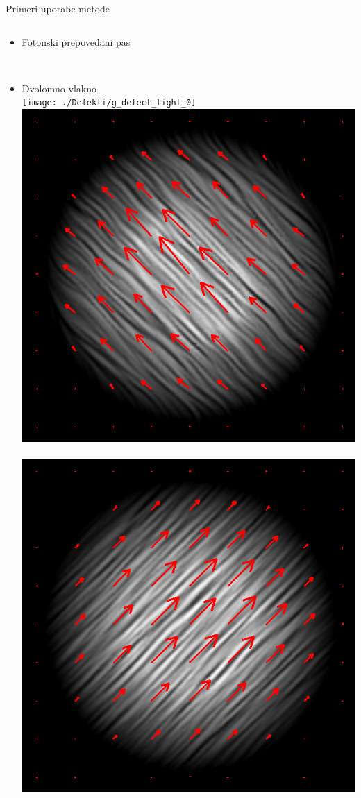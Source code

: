 \documentclass{beamer}
\begin{document}
\begin{frame}{Primeri uporabe metode}
\begin{columns}[c]
\begin{column}[T]{.5\textwidth}
\begin{itemize}
 \item Fotonski prepovedani pas
 \begin{center}
   \resizebox{.7\textwidth}{!}{\footnotesize } \\
    \hspace{-1cm}  \;	
  \resizebox{.6\textwidth}{!}{}
  \end{center}
  
 \item Dvolomno vlakno \\
  \hspace{-0.6cm}
  \texttt{[image: ./Defekti/g\_defect\_light\_0]} \,
  \includegraphics[width=.29\textwidth]{./Slike/licp_0_68} \,
  \includegraphics[width=.29\textwidth]{./Slike/licp_0_78}
\end{itemize}

\end{column}

\end{columns}

\end{frame}
\end{document}
